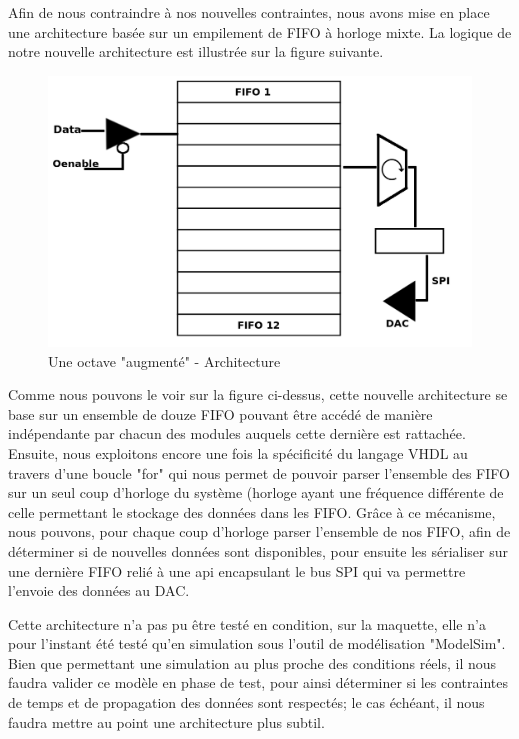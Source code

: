 \documentclass[french,a4paper,12pt]{report}
\begin{document}
		Afin de nous contraindre à nos nouvelles contraintes, nous avons mise en place une architecture basée sur un empilement de FIFO à horloge mixte. La logique de notre nouvelle architecture est illustrée sur la figure suivante.
		
	\begin{figure}[!ht]
    \center
  	\includegraphics[width=12cm]{octave.png}
		\caption{Une octave "augmenté" - Architecture}
	\end{figure}
		
		Comme nous pouvons le voir sur la figure ci-dessus, cette nouvelle architecture se base sur un ensemble de douze FIFO pouvant être accédé de manière indépendante par chacun des modules auquels cette dernière est rattachée. Ensuite, nous exploitons encore une fois la spécificité du langage VHDL au travers d'une boucle "for" qui nous permet de pouvoir parser l'ensemble des FIFO sur un seul coup d'horloge du système (horloge ayant une fréquence différente de celle permettant le stockage des données dans les FIFO.
		Grâce à ce mécanisme, nous pouvons, pour chaque coup d'horloge parser l'ensemble de nos FIFO, afin de déterminer si de nouvelles données sont disponibles, pour ensuite les sérialiser sur une dernière FIFO relié à une api encapsulant le bus SPI qui va permettre l'envoie des données au DAC.
		
		Cette architecture n'a pas pu être testé en condition, sur la maquette, elle n'a pour l'instant été testé qu'en simulation sous l'outil de modélisation "ModelSim". Bien que permettant une simulation au plus proche des conditions réels, il nous faudra valider ce modèle en phase de test, pour ainsi déterminer si les contraintes de temps et de propagation des données sont respectés; le cas échéant, il nous faudra mettre au point une architecture plus subtil.
		
\end{document}
